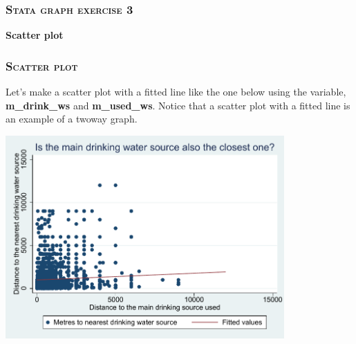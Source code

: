 \documentclass[10pt]{beamer}
\begin{document}
	\begin{frame}
	\frametitle{\textsc{Stata graph exercise 3}}
		\begin{center}
		\Large \textbf{Scatter plot}
		\end{center}
	\end{frame}		
	
	\begin{frame}
	\frametitle{\textsc{Scatter plot}}
		Let's make a scatter plot with a fitted line like the one below using the variable, \textbf{m\_drink\_ws} and \textbf{m\_used\_ws}.
		Notice that a scatter plot with a fitted line is an example of a twoway graph.
		\vspace{1mm}
	
\begin{center}
    \includegraphics[width=0.8\textwidth]{scatter_1.pdf}
\end{center}
	\end{frame}
	
\end{document}
